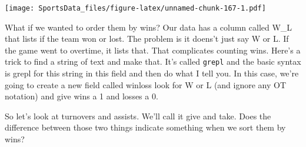 \documentclass[]{book}
\newenvironment{Shaded}{\begin{snugshade}}{\end{snugshade}}
\newcommand{\DataTypeTok}[1]{\textcolor[rgb]{0.13,0.29,0.53}{#1}}
\newcommand{\DecValTok}[1]{\textcolor[rgb]{0.00,0.00,0.81}{#1}}
\newcommand{\KeywordTok}[1]{\textcolor[rgb]{0.13,0.29,0.53}{\textbf{#1}}}
\newcommand{\NormalTok}[1]{#1}
\newcommand{\OperatorTok}[1]{\textcolor[rgb]{0.81,0.36,0.00}{\textbf{#1}}}
\newcommand{\StringTok}[1]{\textcolor[rgb]{0.31,0.60,0.02}{#1}}
\begin{document}
\texttt{[image: SportsData\_files/figure-latex/unnamed-chunk-167-1.pdf]}

What if we wanted to order them by wins? Our data has a column called W\_L that lists if the team won or lost. The problem is it doens't just say W or L. If the game went to overtime, it lists that. That complicates counting wins. Here's a trick to find a string of text and make that. It's called \texttt{grepl} and the basic syntax is grepl for this string in this field and then do what I tell you. In this case, we're going to create a new field called winloss look for W or L (and ignore any OT notation) and give wins a 1 and losses a 0.

\begin{Shaded}
\end{Shaded}

So let's look at turnovers and assists. We'll call it give and take. Does the difference between those two things indicate something when we sort them by wins?

\begin{Shaded}
\end{Shaded}

\begin{Shaded}
\end{Shaded}
\end{document}
